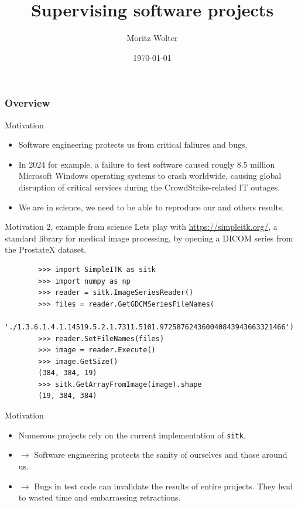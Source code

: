 \documentclass{beamer}
\title{Supervising software projects}
\date{\today}
\institute{HPCA-Lab, Universität Bonn}
\author{Moritz Wolter}
\begin{document}
    \maketitle

    \begin{frame}
    \frametitle{Overview} 
    \tableofcontents
    \end{frame}
    

    \begin{frame}{Motivation}
      \begin{itemize}
        \item Software engineering protects us from critical faliures and bugs.
        \item In 2024 for example, a failure to test software caused rougly 8.5 million Microsoft Windows operating systems to crash worldwide, causing global disruption of critical services
        during the CrowdStrike-related IT outages.
        \item We are in science, we need to be able to reproduce our and others results.
      \end{itemize}
    \end{frame}

    \begin{frame}[fragile]{Motivation 2, example from science}
      Lets play with \url{https://simpleitk.org/}, a standard library for medical image processing,
      by opening a DICOM series from the ProstateX dataset.
      \begin{verbatim}
        >>> import SimpleITK as sitk
        >>> import numpy as np
        >>> reader = sitk.ImageSeriesReader()
        >>> files = reader.GetGDCMSeriesFileNames(
          './1.3.6.1.4.1.14519.5.2.1.7311.5101.972587624360040843943663321466')
        >>> reader.SetFileNames(files)
        >>> image = reader.Execute()
        >>> image.GetSize()
        (384, 384, 19)
        >>> sitk.GetArrayFromImage(image).shape
        (19, 384, 384)
      \end{verbatim}
    \end{frame}

    \begin{frame}{Motivation}
      \begin{itemize}
        \item Numerous projects rely on the current implementation of \texttt{sitk}.
        \item $\rightarrow$ Software engineering protects the sanity of ourselves and those around us.
        \item $\rightarrow$ Bugs in test code can invalidate the results of entire projects. They lead to wasted time and embarrassing retractions.
      \end{itemize}
    \end{frame}
\end{document}
